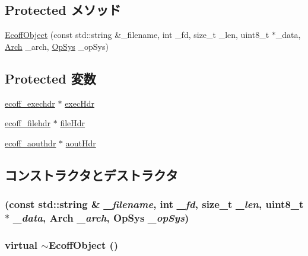 \subsection*{Protected メソッド}
\begin{DoxyCompactItemize}
\item 
\hyperlink{classEcoffObject_a35e8abc28c36228972feaf9e9bd606cb}{EcoffObject} (const std::string \&\_\-filename, int \_\-fd, size\_\-t \_\-len, uint8\_\-t $\ast$\_\-data, \hyperlink{classObjectFile_a0ac03ab06a859320a9072002bdf3aa0f}{Arch} \_\-arch, \hyperlink{classObjectFile_aafc438343baf22e5884dde40c41331e8}{OpSys} \_\-opSys)
\end{DoxyCompactItemize}
\subsection*{Protected 変数}
\begin{DoxyCompactItemize}
\item 
\hyperlink{structecoff__exechdr}{ecoff\_\-exechdr} $\ast$ \hyperlink{classEcoffObject_a0447939fdd24d55b8641d1f4c90ca28b}{execHdr}
\item 
\hyperlink{structecoff__filehdr}{ecoff\_\-filehdr} $\ast$ \hyperlink{classEcoffObject_a6f58ada2e9fe9c6fd1bff41680fcb88e}{fileHdr}
\item 
\hyperlink{structecoff__aouthdr}{ecoff\_\-aouthdr} $\ast$ \hyperlink{classEcoffObject_a472dfe6c2f3be923540cd3e090062f5d}{aoutHdr}
\end{DoxyCompactItemize}


\subsection{コンストラクタとデストラクタ}
\hypertarget{classEcoffObject_a35e8abc28c36228972feaf9e9bd606cb}{
\subsubsection[{EcoffObject}]{ (const std::string \& {\em \_\-filename}, \/  int {\em \_\-fd}, \/  size\_\-t {\em \_\-len}, \/  uint8\_\-t $\ast$ {\em \_\-data}, \/  {\bf Arch} {\em \_\-arch}, \/  {\bf OpSys} {\em \_\-opSys})}}
\label{classEcoffObject_a35e8abc28c36228972feaf9e9bd606cb}
\hypertarget{classEcoffObject_a64f472690e786340ddbcc64b9a8e5597}{
\subsubsection[{$\sim$EcoffObject}]{\setlength{\rightskip}{0pt plus 5cm}virtual $\sim${\bf EcoffObject} ()}}
\label{classEcoffObject_a64f472690e786340ddbcc64b9a8e5597}



